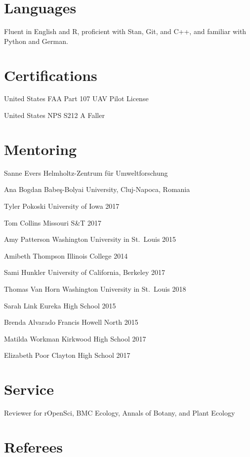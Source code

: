 \documentclass[11pt,]{article}
\begin{document}
\hypertarget{languages}{%
\section{Languages}\label{languages}}

Fluent in English and R, proficient with Stan, Git, and C++, and
familiar with Python and German.

\hypertarget{certifications}{%
\section{Certifications}\label{certifications}}

United States FAA Part 107 UAV Pilot License

United States NPS S212 A Faller

\hypertarget{mentoring}{%
\section{Mentoring}\label{mentoring}}

Sanne Evers \hfill Helmholtz-Zentrum für Umweltforschung

Ana Bogdan \hfill Babe\c s-Bolyai University, Cluj-Napoca, Romania

Tyler Pokoski \hfill  University of Iowa 2017

Tom Collins \hfill Missouri S\&T 2017

Amy Patterson \hfill Washington University in St.~Louis 2015

Amibeth Thompson \hfill Illinois College 2014

Sami Hunkler \hfill University of California, Berkeley 2017

Thomas Van Horn \hfill Washington University in St.~Louis 2018

Sarah Link \hfill Eureka High School 2015

Brenda Alvarado \hfill Francis Howell North 2015

Matilda Workman \hfill Kirkwood High School 2017

Elizabeth Poor \hfill Clayton High School 2017

\hypertarget{service}{%
\section{Service}\label{service}}

Reviewer for rOpenSci, BMC Ecology, Annals of Botany, and Plant Ecology

\hypertarget{referees}{%
\section{Referees}\label{referees}}
\end{document}
